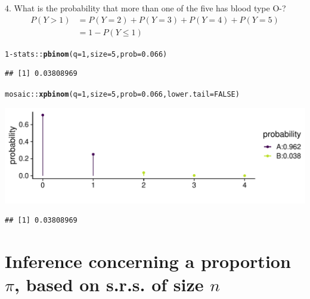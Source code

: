 \documentclass[10pt]{beamer}\usepackage[]{graphicx}\usepackage[]{color}
\makeatletter
\def\maxwidth{ %
  \ifdim\Gin@nat@width>\linewidth
    \linewidth
  \else
    \Gin@nat@width
  \fi
}
\newcommand{\hlnum}[1]{\textcolor[rgb]{0.686,0.059,0.569}{#1}}%
\newcommand{\hlopt}[1]{\textcolor[rgb]{0,0,0}{#1}}%
\newcommand{\hlstd}[1]{\textcolor[rgb]{0.345,0.345,0.345}{#1}}%
\newcommand{\hlkwc}[1]{\textcolor[rgb]{0.333,0.667,0.333}{#1}}%
\newcommand{\hlkwd}[1]{\textcolor[rgb]{0.737,0.353,0.396}{\textbf{#1}}}%
\newenvironment{kframe}{%
 \def\at@end@of@kframe{}%
 \ifinner\ifhmode%
  \def\at@end@of@kframe{\end{minipage}}%
  \begin{minipage}{\columnwidth}%
 \fi\fi%
 \def\FrameCommand##1{\hskip\@totalleftmargin \hskip-\fboxsep
 \colorbox{shadecolor}{##1}\hskip-\fboxsep
     \hskip-\linewidth \hskip-\@totalleftmargin \hskip\columnwidth}%
 \MakeFramed {\advance\hsize-\width
   \@totalleftmargin\z@ \linewidth\hsize
   \@setminipage}}%
 {\par\unskip\endMakeFramed%
 \at@end@of@kframe}
\newenvironment{knitrout}{}{} %
\makeatother
\begin{document}
\begin{frame}[fragile]{4. What is the probability that more than one of the five has blood type O-?}
	\footnotesize
	\begin{align*}
	P(Y > 1) & = P(Y = 2) + P(Y = 3) + P(Y=4) + P(Y=5) \\
	& = 1 - P(Y \leq 1)
	\end{align*}
	
	
\begin{knitrout}\tiny
{}\color{fgcolor}\begin{kframe}
\begin{alltt}
\hlnum{1} \hlopt{-} \hlstd{stats}\hlopt{::}\hlkwd{pbinom}\hlstd{(}\hlkwc{q} \hlstd{=} \hlnum{1}\hlstd{,} \hlkwc{size} \hlstd{=} \hlnum{5}\hlstd{,} \hlkwc{prob} \hlstd{=} \hlnum{0.066}\hlstd{)}
\end{alltt}
\begin{verbatim}
## [1] 0.03808969
\end{verbatim}
\begin{alltt}
\hlstd{mosaic}\hlopt{::}\hlkwd{xpbinom}\hlstd{(}\hlkwc{q} \hlstd{=} \hlnum{1}\hlstd{,} \hlkwc{size} \hlstd{=} \hlnum{5}\hlstd{,} \hlkwc{prob} \hlstd{=} \hlnum{0.066}\hlstd{,} \hlkwc{lower.tail} \hlstd{=} \hlnum{FALSE}\hlstd{)}
\end{alltt}
\end{kframe}

{\centering \includegraphics[width=\maxwidth]{figure/unnamed-chunk-13-1} 

}


\begin{kframe}\begin{verbatim}
## [1] 0.03808969
\end{verbatim}
\end{kframe}
\end{knitrout}
	
\end{frame}



\section{Inference concerning a proportion $\pi$, based on s.r.s. of size $n$}
\end{document}
